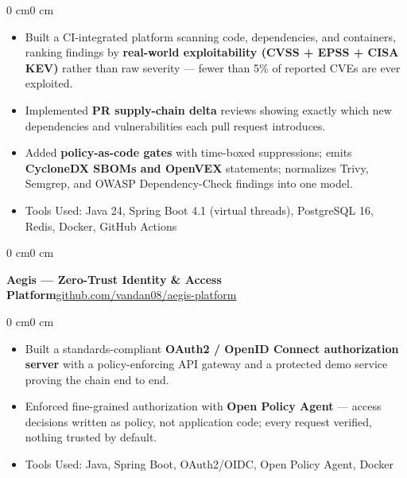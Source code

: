 \documentclass[10pt, letterpaper]{article}
\newenvironment{highlights}{
    \begin{itemize}[
        topsep=0.08 cm,
        parsep=0.08 cm,
        partopsep=0pt,
        itemsep=0pt,
        leftmargin=0.4 cm
    ]
}{
    \end{itemize}
}
\newenvironment{onecolentry}{
    \begin{adjustwidth}{0 cm}{0 cm}
}{
    \end{adjustwidth}
}
\let\hrefWithoutArrow\href
\begin{document}
    \vspace{0.05 cm}
    \begin{onecolentry}
        \begin{highlights}
            \item Built a CI-integrated platform scanning code, dependencies, and containers, ranking findings by \textbf{real-world exploitability (CVSS + EPSS + CISA KEV)} rather than raw severity --- fewer than 5\% of reported CVEs are ever exploited.
            \item Implemented \textbf{PR supply-chain delta} reviews showing exactly which new dependencies and vulnerabilities each pull request introduces.
            \item Added \textbf{policy-as-code gates} with time-boxed suppressions; emits \textbf{CycloneDX SBOMs and OpenVEX} statements; normalizes Trivy, Semgrep, and OWASP Dependency-Check findings into one model.
            \item Tools Used: Java 24, Spring Boot 4.1 (virtual threads), PostgreSQL 16, Redis, Docker, GitHub Actions
        \end{highlights}
    \end{onecolentry}

    \vspace{0.2 cm}

    \begin{onecolentry}
        \textbf{Aegis --- Zero-Trust Identity \& Access Platform}\hfill{\small\hrefWithoutArrow{https://github.com/vandan08/aegis-platform}{github.com/vandan08/aegis-platform}}
    \end{onecolentry}

    \vspace{0.05 cm}
    \begin{onecolentry}
        \begin{highlights}
            \item Built a standards-compliant \textbf{OAuth2 / OpenID Connect authorization server} with a policy-enforcing API gateway and a protected demo service proving the chain end to end.
            \item Enforced fine-grained authorization with \textbf{Open Policy Agent} --- access decisions written as policy, not application code; every request verified, nothing trusted by default.
            \item Tools Used: Java, Spring Boot, OAuth2/OIDC, Open Policy Agent, Docker
        \end{highlights}
    \end{onecolentry}
\end{document}

